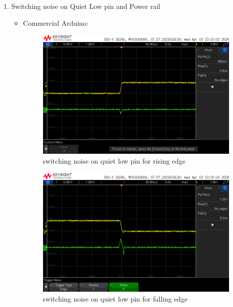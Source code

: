 \documentclass[a4paper,11pt]{article}%
\begin{document}
\begin{enumerate}
	\item Switching noise on Quiet Low pin and Power rail
	      \begin{itemize}
		      \item Commercial Arduino:
		            \begin{figure}[H]
			            \centering
			            \includegraphics[scale=0.6]{figures/commercial_ard/d13_trig_ql.png}
			            \caption{switching noise on quiet low pin for rising edge}
		            \end{figure}

		            \begin{figure}[H]
			            \centering
			            \includegraphics[scale=0.6]{figures/commercial_ard/d13_trig_ql_fall.png}
			            \caption{switching noise on quiet low pin for falling edge}
		            \end{figure}


\end{itemize}
\end{enumerate}
\end{document}
